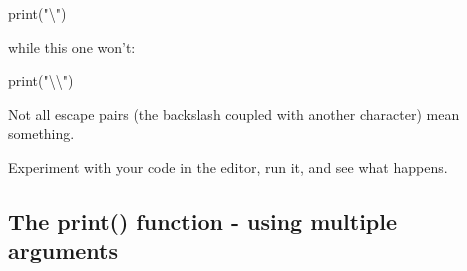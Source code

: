 \documentclass[a4paper,10pt]{article}
\begin{document}
{\selectfont print("\textbackslash")}
\newline

while this one won't:
\newline

{\selectfont print("\textbackslash\textbackslash")}
\newline


Not all escape pairs (the backslash coupled with another character) mean something.
\newline

Experiment with your code in the editor, run it, and see what happens.
\newline

\subsection{The print() function - using multiple arguments}
\end{document}
